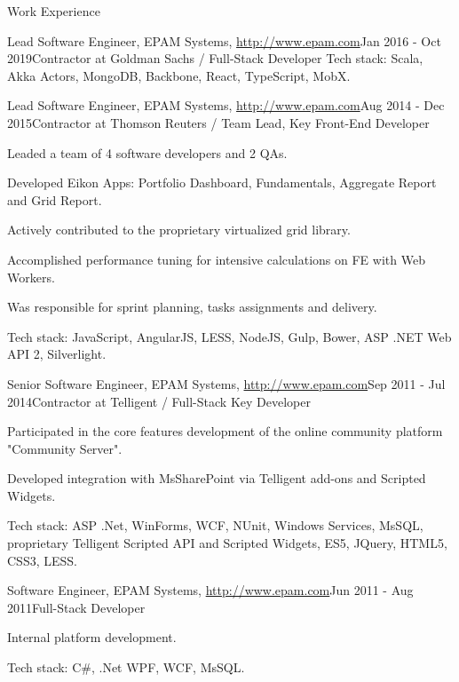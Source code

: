 \documentclass{resume}
\begin{document}
\begin{rSection}{Work Experience}
\begin{rSubsection}{Lead Software Engineer, EPAM Systems, \url{http://www.epam.com}}{Jan 2016 - Oct 2019}{Contractor at Goldman Sachs / Full-Stack Developer}{}
Tech stack: Scala, Akka Actors, MongoDB, Backbone, React, TypeScript, MobX.
\end{rSubsection}


\begin{rSubsection}{Lead Software Engineer, EPAM Systems, \url{http://www.epam.com}}{Aug 2014 - Dec 2015}{Contractor at Thomson Reuters / Team Lead, Key Front-End Developer}{}
\item Leaded a team of 4 software developers and 2 QAs.
\item Developed Eikon Apps: Portfolio Dashboard, Fundamentals, Aggregate Report and Grid Report.
\item Actively contributed to the proprietary virtualized grid library.
\item Accomplished performance tuning for intensive calculations on FE with Web Workers.
\item Was responsible for sprint planning, tasks assignments and delivery.

Tech stack: JavaScript, AngularJS, LESS, NodeJS, Gulp, Bower, ASP .NET Web API 2, Silverlight.
\end{rSubsection}

\begin{rSubsection}{Senior Software Engineer, EPAM Systems, \url{http://www.epam.com}}{Sep 2011 - Jul 2014}{Contractor at Telligent / Full-Stack Key Developer}{}
\item Participated in the core features development of the online community platform "Community Server".
\item Developed integration with MsSharePoint via Telligent add-ons and Scripted Widgets.

Tech stack:  ASP .Net, WinForms, WCF, NUnit, Windows Services, MsSQL, proprietary Telligent Scripted API and Scripted Widgets, ES5, JQuery, HTML5, CSS3, LESS.
\end{rSubsection}


\begin{rSubsection}{Software Engineer, EPAM Systems, \url{http://www.epam.com}}{Jun 2011 - Aug 2011}{Full-Stack Developer}{}
\item Internal platform development.

Tech stack: C\#, .Net WPF, WCF, MsSQL.
\end{rSubsection}

\end{rSection}

\end{document}
